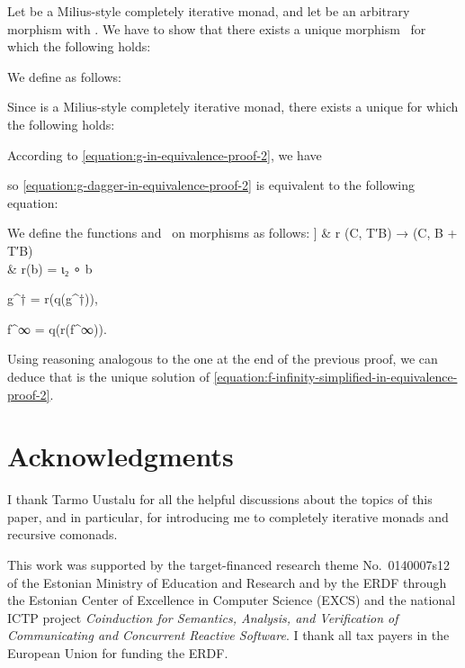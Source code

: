 \documentclass[copyright,creativecommons]{eptcs}
\newcommand{\relwithsizeof}[2]{
    \mathrel{
        \text{\makebox[0mm][c]{\phantom{}\makebox[0mm][c]{}}\phantom{}}
    }
}
\DeclareMathOperator{\Hom}{Hom}
\begin{document}
\begin{extproof}
Let  be a Milius-style completely iterative monad, and let  be an
arbitrary morphism with . We have to show that there exists a
unique morphism~ for which the following holds:

We define  as follows:

Since  is a Milius-style completely iterative monad, there exists a
unique  for which the following holds:

According to \eqref{equation:g-in-equivalence-proof-2}, we have

so \eqref{equation:g-dagger-in-equivalence-proof-2} is equivalent to the
following equation:

We define the functions  and~ on morphisms as follows:
\topsep]
& r \relwithsizeof=: \Hom(C, T′B) → \Hom(C, B + T′B) \notag\\
& r(b) =             ι₂ ∘ b

g^† = r\left(q\left(g^†\right)\right)\enspace,

\label{equation:f-infinity-simplified-in-equivalence-proof-2}
f^∞ = q(r(f^∞))\enspace.

Using reasoning analogous to the one at the end of the previous proof, we can
deduce that  is the unique solution of
\eqref{equation:f-infinity-simplified-in-equivalence-proof-2}.
\end{extproof}

\section*{Acknowledgments}

I thank Tarmo Uustalu for all the helpful discussions about the topics of this
paper, and in particular, for introducing me to completely iterative monads and
recursive comonads.

This work was supported by the target-financed research theme No.~0140007s12 of
the Estonian Ministry of Education and Research and by the ERDF through the
Estonian Center of Excellence in Computer Science (EXCS) and the national ICTP
project \emph{Coinduction for Semantics, Analysis, and Verification of
Communicating and Concurrent Reactive Software}. I thank all tax payers in the
European Union for funding the ERDF.



\end{document}
